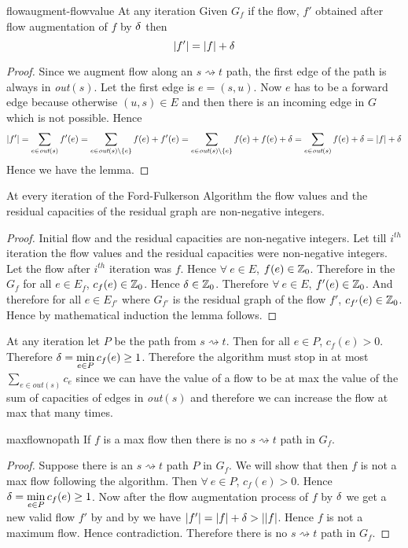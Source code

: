 \begin{lemma}{}{flowaugment-flowvalue}
	At any iteration Given $G_f$ if the flow, $f'$ obtained after flow augmentation of $f$ by $\delta$ then $$|f'|=|f|+\delta$$
\end{lemma}
\begin{proof}
	Since we augment flow along an $s\rightsquigarrow t$ path, the first edge of the path is always in \textit{out}$(s)$. Let the first edge is $e=(s,u)$. Now $e$ has to be a forward edge because otherwise $(u,s)\in E$ and then there is an incoming edge in $G$ which is not possible. Hence $$|f'|=\sum\limits_{e\in \textit{out}(s)}f'(e)=\sum_{e\in \textit{out}(s)\setminus\{e\}}f(e)+f'(e)=\sum_{e\in \textit{out}(s)\setminus\{e\}}f(e)+f(e)+\delta=\sum_{e\in\textit{out}(s)}f(e)+\delta=|f|+\delta$$Hence we have the lemma.
\end{proof}
\begin{lemma}{}{}
	At every iteration of the Ford-Fulkerson Algorithm the flow values and the residual capacities of the residual graph are non-negative integers.
\end{lemma}
\begin{proof}
	Initial flow and the residual capacities are non-negative integers. Let till $i^{th}$ iteration the flow values and the residual capacities were non-negative integers. Let the flow after $i^{th}$ iteration was $f$. Hence $\forall\ e\in E$, $f(e)\in \mathbb{Z}_0$. Therefore in the $G_f$ for all $e\in E_f$, $c_f(e)\in\mathbb{Z}_0$. Hence $\delta\in\mathbb{Z}_0$. Therefore $\forall\ e\in E$, $f'(e)\in\mathbb{Z}_0$. And therefore for all $e\in E_{f'}$ where $G_{f'}$ is the residual graph of the flow $f'$, $c_{f'}(e)\in\mathbb{Z}_0$. Hence by mathematical induction the lemma follows.
\end{proof}
At any iteration let $P$ be the path from $s\rightsquigarrow t$. Then for all $e\in P$, $c_f(e)>0$. Therefore $\delta=\min\limits_{e\in P}c_f(e)\geq 1$. Therefore the algorithm must stop in at most $\sum\limits_{e\in \textit{out}(s)}c_e$ since we can have the value of a flow to be at max the value of the sum of capacities of edges in \textit{out}$(s)$ and therefore we can increase the flow at max that many times.
\begin{lemma}{}{maxflownopath}
	If $f$ is a max flow then there is no $s\rightsquigarrow t$ path in $G_f$.
\end{lemma}
\begin{proof}
	Suppose there is an $s\rightsquigarrow t$ path $P$ in $G_f$. We will show that then $f$ is not a max flow following the algorithm. Then $\forall\ e\in P$, $c_f(e)>0$. Hence $\delta=\min\limits_{e\in P}c_f(e)\geq 1$. Now after the flow augmentation process of $f$ by $\delta$ we get a new valid flow $f'$ by  and by  we have $|f'|=|f|+\delta>||f|$. Hence $f$ is not a maximum flow. Hence contradiction. Therefore there is no $s\rightsquigarrow t$ path in $G_f$.
\end{proof}
